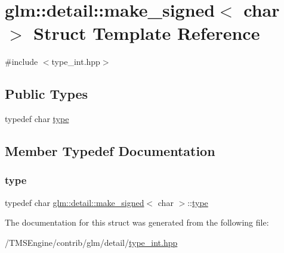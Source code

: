\hypertarget{structglm_1_1detail_1_1make__signed_3_01char_01_4}{}\section{glm\+:\+:detail\+:\+:make\+\_\+signed$<$ char $>$ Struct Template Reference}
\label{structglm_1_1detail_1_1make__signed_3_01char_01_4}


{\ttfamily \#include $<$type\+\_\+int.\+hpp$>$}

\subsection*{Public Types}
\begin{DoxyCompactItemize}
\item 
typedef char \hyperlink{structglm_1_1detail_1_1make__signed_3_01char_01_4_ad92111512e0af83393df0905896d478f}{type}
\end{DoxyCompactItemize}


\subsection{Member Typedef Documentation}
\mbox{\label{structglm_1_1detail_1_1make__signed_3_01char_01_4_ad92111512e0af83393df0905896d478f}} 
\subsubsection{\texorpdfstring{type}{type}}
{\footnotesize\ttfamily typedef char \hyperlink{structglm_1_1detail_1_1make__signed}{glm\+::detail\+::make\+\_\+signed}$<$ char $>$\+::\hyperlink{structglm_1_1detail_1_1make__signed_3_01char_01_4_ad92111512e0af83393df0905896d478f}{type}}



The documentation for this struct was generated from the following file\+:\begin{DoxyCompactItemize}
\item 
/\+T\+M\+S\+Engine/contrib/glm/detail/\hyperlink{type__int_8hpp}{type\+\_\+int.\+hpp}\end{DoxyCompactItemize}
